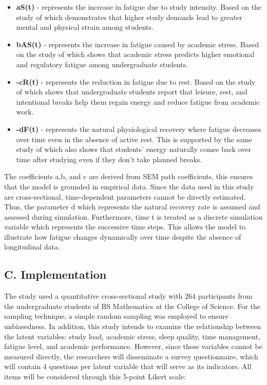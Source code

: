 \documentclass [12pt]{article}
\begin{document}
\begin{itemize}
    \item \textbf{aS(t)} - represents the increase in fatigue due to study intensity. Based on the study of \textcite{alhamed2023academicstress} which demonstrates that higher study demands lead to greater mental and physical strain among students. 

    \item \textbf{bAS(t)} - represents the increase in fatigue caused by academic stress. Based on the study of \textcite{zhang2022academicstress} which shows that academic stress predicts higher emotional and regulatory fatigue among undergraduate students. 

    \item \textbf{-cR(t)} - represents the reduction in fatigue due to rest. Based on the study of \textcite{shaw2025restvalues} which shows that undergraduate students report that leisure, rest, and intentional breaks help them regain energy and reduce fatigue from academic work.  

    \item \textbf{-dF(t)} - represents the natural physiological recovery where fatigue decreases over time even in the absence of active rest. This is supported by the same study of \textcite{shaw2025restvalues} which also shows that students’ energy naturally comes back over time after studying even if they don’t take planned breaks. 
\end{itemize}

The coefficients a,b, and c are derived from SEM path coefficients, this ensures that the model is grounded in empirical data. Since the data used in this study are cross-sectional, time-dependent parameters cannot be directly estimated. Thus, the parameter d which represents the natural recovery rate is assumed and assessed during simulation. Furthermore, time t is treated as a discrete simulation variable which represents the successive time steps. This allows the model to illustrate how fatigue changes dynamically over time despite the absence of longitudinal data. 

\subsection*{C. Implementation}

The study used a quantitative cross-sectional study with 264 participants from the undergraduate students of BS Mathematics at the College of Science. For the sampling technique, a simple random sampling was employed to ensure unbiasedness. In addition, this study intends to examine the relationship between the latent variables: study load, academic stress, sleep quality, time management, fatigue level, and academic performance. However, since these variables cannot be measured directly, the researchers will disseminate a survey questionnaire, which will contain 4 questions per latent variable that will serve as its indicators. All items will be considered through this 5-point Likert scale: 
\end{document}

